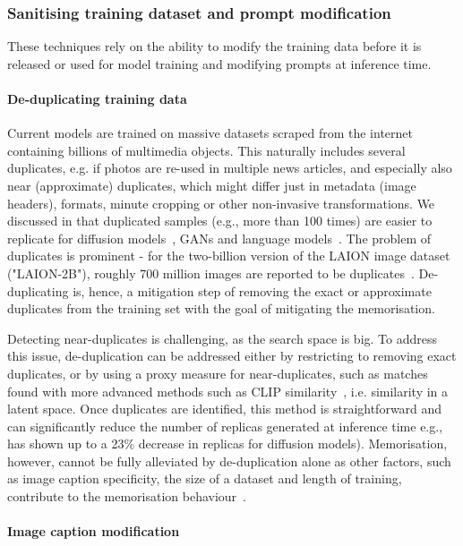 \documentclass[conference,table]{IEEEtran}
\begin{document}
\subsubsection{Sanitising training dataset and prompt modification}\label{sec:mitigation-sanitising}
These techniques rely on the ability to modify the training data before it is released or used for model training and modifying prompts at inference time.
\paragraph{De-duplicating training data} 
Current models are trained on massive datasets scraped from the internet containing billions of multimedia objects. This naturally includes several duplicates, e.g. if photos are re-used in multiple news articles, and especially also near (approximate) duplicates, which might differ just in metadata (image headers), formats, minute cropping or other non-invasive transformations. 
We discussed in  that duplicated samples (e.g., more than 100 times) are easier to replicate for diffusion models~\cite{carlini_extracting_2023}, GANs and language models~\cite{carlini_extracting_2021,kandpal_large_2023}.
The problem of duplicates is prominent - for the two-billion version of the LAION image dataset ("LAION-2B"), roughly 700 million images are reported to be duplicates~\cite{webster_-duplication_2023}.
De-duplicating is, hence, a mitigation step of removing the exact or approximate duplicates from the training set with the goal of mitigating the memorisation. 

Detecting near-duplicates is challenging, as the search space is big. 
To address this issue, de-duplication can be addressed either by restricting to removing exact duplicates, or by using a proxy measure for near-duplicates, such as matches found with more advanced methods such as CLIP similarity~\cite{radford_learning_2021,webster_-duplication_2023}, i.e. similarity in a latent space. 
Once duplicates are identified, this method is straightforward and can significantly reduce the number of replicas generated at inference time e.g., \cite{carlini_extracting_2023} has shown up to a 23\% decrease in replicas for diffusion models). 
Memorisation, however, cannot be fully alleviated by de-duplication alone as other factors, such as image caption specificity, the size of a dataset and length of training, contribute to the memorisation behaviour~\cite{somepalli_understanding_2023}.


\paragraph{Image caption modification}\label{sec:mitigation-sanitising-caption}
\end{document}
